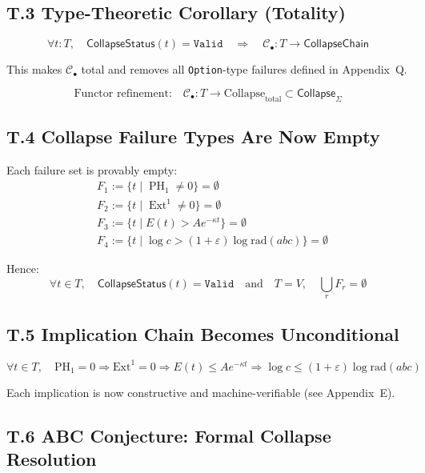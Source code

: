 \documentclass[11pt]{article}
\DeclareMathOperator{\Ext}{Ext}
\DeclareMathOperator{\PH}{PH}
\begin{document}
\subsection*{T.3 Type-Theoretic Corollary (Totality)}

\[
\forall t : T, \quad \mathsf{CollapseStatus}(t) = \texttt{Valid}
\quad\Rightarrow\quad
\mathcal{C}_\bullet : T \to \mathsf{CollapseChain}
\]

This makes \( \mathcal{C}_\bullet \) total and removes all \texttt{Option}-type failures defined in Appendix~Q.

\[
\text{Functor refinement:} \quad \mathcal{C}_\bullet : T \longrightarrow \mathrm{Collapse}_{\mathrm{total}} \subset \mathsf{Collapse}_{\Sigma}
\]

\subsection*{T.4 Collapse Failure Types Are Now Empty}

Each failure set is provably empty:
\[
\begin{aligned}
& F_1 := \{ t \mid \PH_1 \neq 0 \} = \emptyset \\
& F_2 := \{ t \mid \Ext^1 \neq 0 \} = \emptyset \\
& F_3 := \{ t \mid E(t) > A e^{-\kappa t} \} = \emptyset \\
& F_4 := \{ t \mid \log c > (1+\varepsilon)\log \mathrm{rad}(abc) \} = \emptyset
\end{aligned}
\]

Hence:
\[
\forall t \in T,\quad \mathsf{CollapseStatus}(t) = \texttt{Valid}
\quad\text{and}\quad T = V,\quad \bigcup_r F_r = \emptyset
\]

\subsection*{T.5 Implication Chain Becomes Unconditional}

\[
\forall t \in T,\quad
\mathrm{PH}_1 = 0 \Rightarrow \mathrm{Ext}^1 = 0 \Rightarrow E(t) \leq Ae^{-\kappa t} \Rightarrow
\log c \leq (1 + \varepsilon)\log \mathrm{rad}(abc)
\]

Each implication is now constructive and machine-verifiable (see Appendix~E).

\subsection*{T.6 ABC Conjecture: Formal Collapse Resolution}
\end{document}
